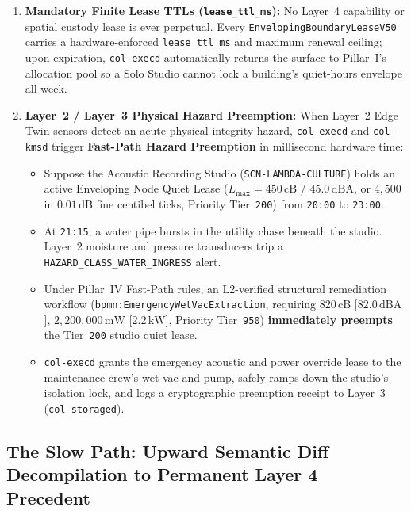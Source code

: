 \begin{enumerate}
\item \textbf{Mandatory Finite Lease TTLs (\texttt{lease\_ttl\_ms}):} No Layer~4 capability or
        spatial custody lease is ever perpetual. Every \texttt{EnvelopingBoundaryLeaseV50} carries
        a hardware-enforced \texttt{lease\_ttl\_ms} and maximum renewal ceiling; upon expiration,
        \texttt{col-execd} automatically returns the surface to Pillar~I's allocation pool so a
        Solo Studio cannot lock a building's quiet-hours envelope all week.
\item \textbf{Layer~2 / Layer~3 Physical Hazard Preemption:} When Layer~2 Edge Twin sensors detect
        an acute physical integrity hazard, \texttt{col-execd} and \texttt{col-kmsd} trigger
        \textbf{Fast-Path Hazard Preemption} in millisecond hardware time:
        \begin{itemize}
        \item Suppose the Acoustic Recording Studio (\texttt{SCN-LAMBDA-CULTURE}) holds an active
                Enveloping Node Quiet Lease ($L_{\max} = 450\,\mathrm{cB}$ / $45.0\,\mathrm{dBA}$,
                or $4{,}500$ in $0.01\,\mathrm{dB}$ fine centibel ticks, Priority Tier~\texttt{200})
                from \texttt{20:00} to \texttt{23:00}.
        \item At \texttt{21:15}, a water pipe bursts in the utility chase beneath the studio.
                Layer~2 moisture and pressure transducers trip a \texttt{HAZARD\_CLASS\_WATER\_INGRESS}
                alert.
        \item Under Pillar~IV Fast-Path rules, an L2-verified structural remediation workflow
                (\texttt{bpmn:EmergencyWetVacExtraction}, requiring $820\,\mathrm{cB}$
                [$82.0\,\mathrm{dBA}$], $2{,}200{,}000\,\mathrm{mW}$ [$2.2\,\mathrm{kW}$], Priority
                Tier~\texttt{950}) \textbf{immediately preempts} the Tier~\texttt{200} studio quiet
                lease.
        \item \texttt{col-execd} grants the emergency acoustic and power override lease to the
                maintenance crew's wet-vac and pump, safely ramps down the studio's isolation lock,
                and logs a cryptographic preemption receipt to Layer~3 (\texttt{col-storaged}).
        \end{itemize}
\end{enumerate}

\subsection{The Slow Path: Upward Semantic Diff Decompilation to Permanent Layer 4 Precedent}

